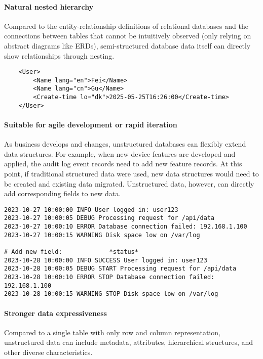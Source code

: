 \documentclass{article}
\begin{document}
\paragraph{Natural nested hierarchy}
Compared to the entity-relationship definitions of relational databases and the connections between tables that cannot be intuitively observed (only relying on abstract diagrams like ERDs), semi-structured database data itself can directly show relationships through nesting.
\begin{lstlisting}
	<User>
		<Name lang="en">Fei</Name>
		<Name lang="cn">Gu</Name>
		<Create-time lo="dk">2025-05-25T16:26:00</Create-time>
	</User>
\end{lstlisting}

\paragraph{Suitable for agile development or rapid iteration}
As business develops and changes, unstructured databases can flexibly extend data structures.
For example, when new device features are developed and applied, the audit log event records need to add new feature records. At this point, if traditional structured data were used, new data structures would need to be created and existing data migrated. Unstructured data, however, can directly add corresponding fields to new data.
\begin{lstlisting}
2023-10-27 10:00:00 INFO User logged in: user123 
2023-10-27 10:00:05 DEBUG Processing request for /api/data 
2023-10-27 10:00:10 ERROR Database connection failed: 192.168.1.100 
2023-10-27 10:00:15 WARNING Disk space low on /var/log

# Add new field:             *status*
2023-10-28 10:00:00 INFO SUCCESS User logged in: user123
2023-10-28 10:00:05 DEBUG START Processing request for /api/data 
2023-10-28 10:00:10 ERROR STOP Database connection failed: 192.168.1.100 
2023-10-28 10:00:15 WARNING STOP Disk space low on /var/log
\end{lstlisting}

\paragraph{Stronger data expressiveness}
Compared to a single table with only row and column representation, unstructured data can include metadata, attributes, hierarchical structures, and other diverse characteristics.

\end{document}
